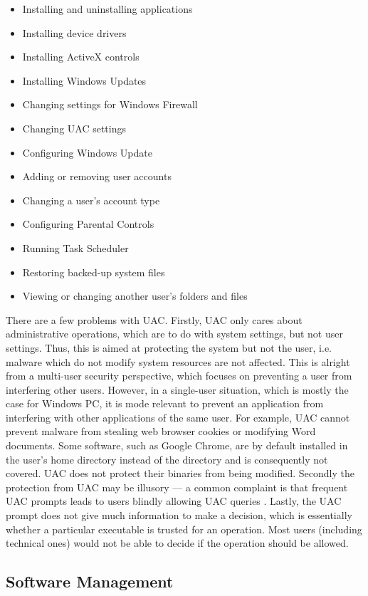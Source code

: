 \begin{itemize}
\item Installing and uninstalling applications
\item Installing device drivers
\item Installing ActiveX controls
\item Installing Windows Updates
\item Changing settings for Windows Firewall
\item Changing UAC settings
\item Configuring Windows Update
\item Adding or removing user accounts
\item Changing a user's account type
\item Configuring Parental Controls
\item Running Task Scheduler
\item Restoring backed-up system files
\item Viewing or changing another user's folders and files
\end{itemize}

There are a few problems with UAC.
Firstly, UAC only cares about administrative operations, which
are to do with system settings, but not user settings.
Thus, this is aimed at protecting the system but not the user, i.e.
malware which do not modify system resources are not affected.
This is alright from a multi-user security perspective, which focuses on
preventing a user from interfering other users.
However, in a single-user situation, which is mostly the case for Windows PC,
it is mode relevant to prevent an application from interfering with other
applications of the same user.
For example, UAC cannot prevent malware from stealing web browser
cookies or modifying Word documents.
Some software, such as Google Chrome, are by default
installed in the user's home directory instead of the 
directory and is consequently not covered.
UAC does not protect their binaries from being modified.
Secondly the protection from UAC may be illusory --- a common complaint is that
frequent UAC prompts leads to users
blindly allowing UAC queries \cite{motiee2010windows}.
Lastly, the UAC prompt does not give much information to make a decision,
which is essentially whether a particular executable is trusted for an
operation.
Most users (including technical ones) would not be able
to decide if the operation should be allowed.

\subsection{Software Management}
\label{sec:wi-management}

